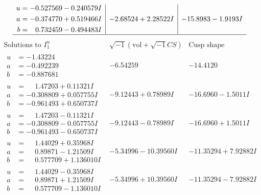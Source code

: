 \documentclass[1p]{elsarticle_modified}
\theoremstyle{definition}
\newcommand{\I}{\sqrt{-1}}
\begin{document}
$$\begin{array}{c|c|c}
\begin{aligned}
u &= -0.527569 - 0.240579 I \\
a &= -0.374770 + 0.519466 I \\
b &= \phantom{-}0.732459 - 0.494483 I\end{aligned}
 & -2.68524 + 2.28522 I & -15.8983 - 1.9193 I\\
 \hline 
 \end{array}$$\newpage$$\begin{array}{c|c|c}  
\text{Solutions to }I^u_{1}& \I (\text{vol} + \sqrt{-1}CS) & \text{Cusp shape}\\
 \hline 
\begin{aligned}
u &= -1.43224\phantom{ +0.000000I} \\
a &= -0.492239\phantom{ +0.000000I} \\
b &= -0.887681\phantom{ +0.000000I}\end{aligned}
 & -6.54259\phantom{ +0.000000I} & -14.4120\phantom{ +0.000000I} \\ \hline\begin{aligned}
u &= \phantom{-}1.47203 + 0.11321 I \\
a &= -0.308809 + 0.057755 I \\
b &= -0.961493 + 0.650737 I\end{aligned}
 & -9.12443 + 0.78989 I & -16.6960 - 1.5011 I \\ \hline\begin{aligned}
u &= \phantom{-}1.47203 - 0.11321 I \\
a &= -0.308809 - 0.057755 I \\
b &= -0.961493 - 0.650737 I\end{aligned}
 & -9.12443 - 0.78989 I & -16.6960 + 1.5011 I \\ \hline\begin{aligned}
u &= \phantom{-}1.44029 + 0.35968 I \\
a &= \phantom{-}0.89871 - 1.21509 I \\
b &= \phantom{-}0.577709 + 1.136010 I\end{aligned}
 & -5.34996 - 10.39560 I & -11.35294 + 7.92882 I \\ \hline\begin{aligned}
u &= \phantom{-}1.44029 - 0.35968 I \\
a &= \phantom{-}0.89871 + 1.21509 I \\
b &= \phantom{-}0.577709 - 1.136010 I\end{aligned}
 & -5.34996 + 10.39560 I & -11.35294 - 7.92882 I \\ \hline\begin{aligned}

\end{aligned}
\end{array}$$
\end{document}

